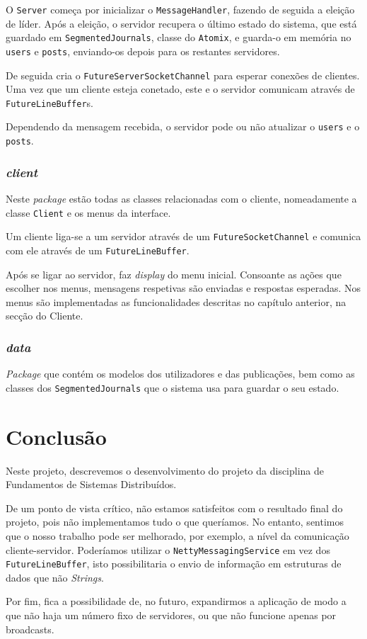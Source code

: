 \documentclass[12pt, a4paper]{report}
\begin{document}
O \texttt{Server} começa por inicializar o \texttt{MessageHandler}, fazendo de seguida a eleição de líder.
Após a eleição, o servidor recupera o último estado do sistema, que está guardado em \texttt{SegmentedJournals}, classe do \texttt{Atomix}, e guarda-o em memória no \texttt{users} e \texttt{posts}, enviando-os depois para os restantes servidores.

De seguida cria o \texttt{FutureServerSocketChannel} para esperar conexões de clientes.
Uma vez que um cliente esteja conetado, este e o servidor comunicam através de \texttt{FutureLineBuffer}s.

Dependendo da mensagem recebida, o servidor pode ou não atualizar o \texttt{users} e o \texttt{posts}.



\subsection{\textit{client}}
Neste \textit{package} estão todas as classes relacionadas com o cliente, nomeadamente a classe \texttt{Client} e os menus da interface.

Um cliente liga-se a um servidor através de um \texttt{FutureSocketChannel} e comunica com ele através de um \texttt{FutureLineBuffer}.

Após se ligar ao servidor, faz \textit{display} do menu inicial.
Consoante as ações que escolher nos menus, mensagens respetivas são enviadas e respostas esperadas.
Nos menus são implementadas as funcionalidades descritas no capítulo anterior, na secção do Cliente.


\subsection{\textit{data}}
\textit{Package} que contém os modelos dos utilizadores e das publicações, bem como as classes dos \texttt{SegmentedJournals} que o sistema usa para guardar o seu estado.


\chapter{Conclusão}
Neste projeto, descrevemos o desenvolvimento do projeto da disciplina de Fundamentos de Sistemas Distribuídos.

De um ponto de vista crítico, não estamos satisfeitos com o resultado final do projeto, pois não implementamos tudo o que queríamos.
No entanto, sentimos que o nosso trabalho pode ser melhorado, por exemplo, a nível da comunicação cliente-servidor. Poderíamos utilizar o \texttt{NettyMessagingService} em vez dos \texttt{FutureLineBuffer}, isto possibilitaria o envio de informação em estruturas de dados que não \textit{Strings}.

Por fim, fica a possibilidade de, no futuro, expandirmos a aplicação de modo a que não haja um número fixo de servidores, ou que não funcione apenas por broadcasts.
\end{document}
